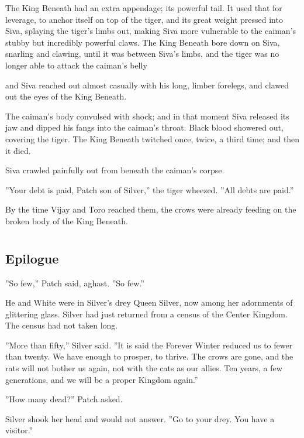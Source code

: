 \documentclass[12pt]{book}
\begin{document}
The King Beneath had an extra appendage; its powerful tail. It used that for leverage, to anchor itself on top of the tiger, and its great weight pressed into Siva, splaying the tiger's limbs out, making Siva more vulnerable to the caiman's stubby but incredibly powerful claws. The King Beneath bore down on Siva, snarling and clawing, until it was between Siva's limbs, and the tiger was no longer able to attack the caiman's belly %

and Siva reached out almost casually with his long, limber forelegs, and clawed out the eyes of the King Beneath.

The caiman's body convulsed with shock; and in that moment Siva released its jaw and dipped his fangs into the caiman's throat. Black blood showered out, covering the tiger. The King Beneath twitched once, twice, a third time; and then it died.

Siva crawled painfully out from beneath the caiman's corpse.

''Your debt is paid, Patch son of Silver,'' the tiger wheezed. ''All debts are paid.''

By the time Vijay and Toro reached them, the crows were already feeding on the broken body of the King Beneath.


\chapter{}

\section{Epilogue}

''So few,'' Patch said, aghast. ''So few.''

He and White were in Silver's drey %
Queen Silver, now %
among her adornments of glittering glass. Silver had just returned from a census of the Center Kingdom. The census had not taken long.

''More than fifty,'' Silver said. ''It is said the Forever Winter reduced us to fewer than twenty. We have enough to prosper, to thrive. The crows are gone, and the rats will not bother us again, not with the cats as our allies. Ten years, a few generations, and we will be a proper Kingdom again.''

''How many dead?'' Patch asked.

Silver shook her head and would not answer. ''Go to your drey. You have a visitor.''
\end{document}

